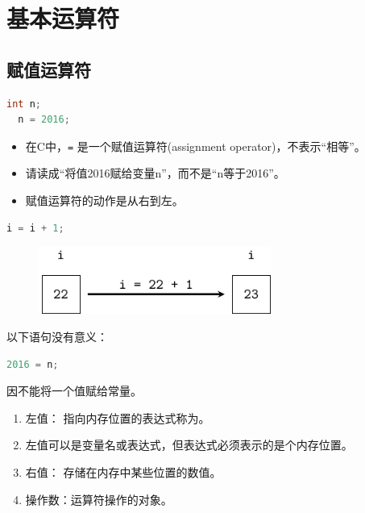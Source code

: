 \section{基本运算符}

\subsection{赋值运算符}
\begin{frame}[fragile]\ft{\subsecname}
\begin{lstlisting}[language=c,backgroundcolor=\color{red!10}]
  int n; 
  n = 2016;
\end{lstlisting} \pause 

\begin{itemize}
\item 在C中，\lstinline|=| 是一个赋值运算符(assignment operator)，不表示“相等”。\\[0.15in]
\item 请读成“将值2016赋给变量n”，而不是“n等于2016”。\\[0.15in]
\item 赋值运算符的动作是从右到左。
\end{itemize}

\end{frame}

\begin{frame}[fragile]\ft{\subsecname}
\begin{lstlisting}[language=c,backgroundcolor=\color{red!10}]
  i = i + 1;
\end{lstlisting} \pause 
\begin{figure}
\centering
\includegraphics[width=3in]{ch05/images/assign.pdf}
\end{figure}
\end{frame}

\begin{frame}[fragile]\ft{\subsecname}
以下语句没有意义：
\begin{lstlisting}[language=c,backgroundcolor=\color{red!10}]
  2016 = n;
\end{lstlisting} 	
因不能将一个值赋给常量。
\end{frame}

\begin{frame}[fragile]\ft{\subsecname}
\begin{enumerate}
\item 左值： 指向内存位置的表达式称为。\\[0.4cm]
\item[] 左值可以是变量名或表达式，但表达式必须表示的是个内存位置。\\[0.4cm]
\item 右值： 存储在内存中某些位置的数值。\\[0.4cm]
\item 操作数：运算符操作的对象。
\end{enumerate}
\end{frame}


